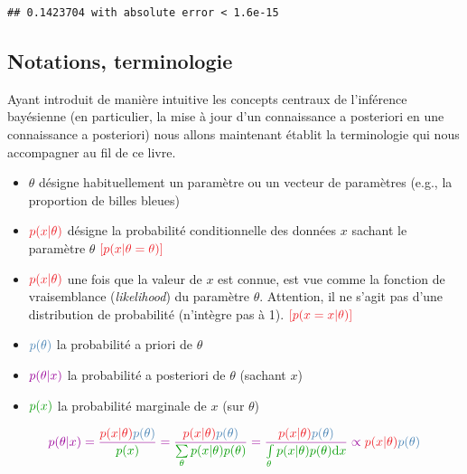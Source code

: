 \documentclass[
  a4paper,11pt,twoside,onecolumn,openright,final,oldfontcommands]{memoir}
\theoremstyle{definition}
\theoremstyle{definition}
\theoremstyle{definition}
\theoremstyle{definition}
\theoremstyle{remark}
\begin{document}
\begin{verbatim}
## 0.1423704 with absolute error < 1.6e-15
\end{verbatim}

\hypertarget{notations-terminologie}{%
\subsection{Notations, terminologie}\label{notations-terminologie}}

Ayant introduit de manière intuitive les concepts centraux de l'inférence bayésienne (en particulier, la mise à jour d'un connaissance a posteriori en une connaissance a posteriori) nous allons maintenant établit la terminologie qui nous accompagner au fil de ce livre.

\begin{itemize}
\item
  \(\theta\) désigne habituellement un paramètre ou un vecteur de paramètres (e.g., la proportion de billes bleues)
\item
  \(\color{orangered}{p(x\vert \theta)}\) { désigne la probabilité conditionnelle des données \(x\) sachant le paramètre \(\theta\) } \(\color{orangered}{[p(x | \theta = \theta)]}\)
\item
  \(\color{orangered}{p(x\vert \theta)}\) { une fois que la valeur de \(x\) est connue, est vue comme la fonction de vraisemblance (\emph{likelihood}) du paramètre \(\theta\). Attention, il ne s'agit pas d'une distribution de probabilité (n'intègre pas à 1). } \(\color{orangered}{[p(x = x | \theta)]}\)
\item
  \(\color{steelblue}{p(\theta)}\) { la probabilité a priori de \(\theta\)}
\item
  \(\color{purple}{p(\theta \vert x)}\) { la probabilité a posteriori de \(\theta\) (sachant \(x\))}
\item
  \(\color{green}{p(x)}\) { la probabilité marginale de \(x\) (sur \(\theta\))}
\end{itemize}

\[
\color{purple}{p(\theta \vert x)} = \dfrac{\color{orangered}{p(x\vert \theta)} \color{steelblue}{p(\theta)}}{\color{green}{p(x)}} = \dfrac{\color{orangered}{p(x\vert \theta)} \color{steelblue}{p(\theta)}}{\color{green}{\sum\limits_{\theta}p(x|\theta)p(\theta)}} = \dfrac{\color{orangered}{p(x\vert \theta)} \color{steelblue}{p(\theta)}}{\color{green}{\int\limits_{\theta}p(x|\theta)p(\theta)\mathrm{d}x}} \propto \color{orangered}{p(x\vert \theta)} \color{steelblue}{p(\theta)}
\]
\end{document}
